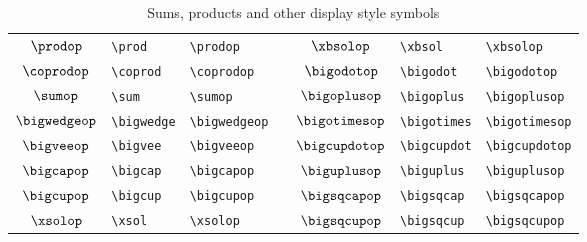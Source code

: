 \documentclass[captions=tableheading]{scrartcl}
\begin{document}
\begin{table}
  \caption{Sums, products and other display style symbols}
  \label{tab:large-symbols}
  \centering
  \begin{tabular}[c]{cllp{1pt}cll}
    \toprule
    $\prodop$ & \verb|\prod| & \verb|\prodop| & &
    $\xbsolop$ & \verb|\xbsol| & \verb|\xbsolop| \\
    $\coprodop$ & \verb|\coprod| & \verb|\coprodop| & &
    $\bigodotop$ & \verb|\bigodot| & \verb|\bigodotop| \\
    $\sumop$ & \verb|\sum| & \verb|\sumop| & &
    $\bigoplusop$ & \verb|\bigoplus| & \verb|\bigoplusop| \\
    $\bigwedgeop$ & \verb|\bigwedge| & \verb|\bigwedgeop| & &
    $\bigotimesop$ & \verb|\bigotimes| & \verb|\bigotimesop| \\
    \addlinespace
    $\bigveeop$ & \verb|\bigvee| & \verb|\bigveeop| & &
    $\bigcupdotop$ & \verb|\bigcupdot| & \verb|\bigcupdotop| \\
    $\bigcapop$ & \verb|\bigcap| & \verb|\bigcapop| & &
    $\biguplusop$ & \verb|\biguplus| & \verb|\biguplusop| \\
    $\bigcupop$ & \verb|\bigcup| & \verb|\bigcupop| & &
    $\bigsqcapop$ & \verb|\bigsqcap| & \verb|\bigsqcapop| \\
    $\xsolop$ & \verb|\xsol| & \verb|\xsolop| & &
    $\bigsqcupop$ & \verb|\bigsqcup| & \verb|\bigsqcupop| \\
    \bottomrule
  \end{tabular}
\end{table}
\end{document}
